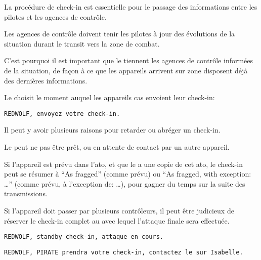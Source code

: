 La procédure de check-in est essentielle pour le passage des informations entre les pilotes et les agences de contrôle.

Les agences de contrôle doivent tenir les pilotes à jour des évolutions de la situation durant le transit vers la zone de combat.

C'est pourquoi il est important que le\ja{} tiennent les agences de contrôle informées de la situation, de façon à ce que les appareils arrivent sur zone disposent déjà des dernières informations.

\begin{e1}
	
	\begin{minipage}{\linewidth}
		\item Le \ja{} choisit le moment auquel les appareils \gls{cas} envoient leur check-in:
		
		\begin{lstlisting}[caption=Check-in: envoi, label=checkinsend]
	REDWOLF, envoyez votre check-in.
		\end{lstlisting}
	\end{minipage}
	
	\item Il peut y avoir plusieurs raisons pour retarder ou abréger un check-in.
	
	Le \ja{} peut ne pas être prêt, ou en attente de contact par un autre appareil.
	
	Si l'appareil est prévu dans l'\gls{ato}, et que le \ja{} a une copie de cet \gls{ato}, le check-in peut se résumer à ``As fragged'' (comme prévu) ou ``As fragged, with exception: \ldots{}'' (comme prévu, à l'exception de: \ldots{}), pour gagner du temps sur la suite des transmissions.
	
	Si l'appareil doit passer par plusieurs contrôleurs, il peut être judicieux de réserver le check-in complet au \ja{} avec lequel l'attaque finale sera effectuée.
	
	\begin{minipage}{\linewidth}
	\begin{lstlisting}[caption=Check-in: standby, label=checkinstandby]
	REDWOLF, standby check-in, attaque en cours.
	\end{lstlisting}
	\end{minipage}
	
	\begin{minipage}{\linewidth}
	\begin{lstlisting}[caption=Check-in: autre contrôleur, label=checkinothercontrol]
	REDWOLF, PIRATE prendra votre check-in, contactez le sur Isabelle.
	\end{lstlisting}
	\end{minipage}
	

\end{e1}
